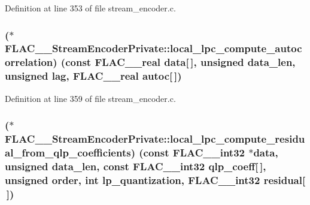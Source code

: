 Definition at line 353 of file stream\+\_\+encoder.\+c.

\subsubsection[{\texorpdfstring{local\+\_\+lpc\+\_\+compute\+\_\+autocorrelation}{local_lpc_compute_autocorrelation}}]{($\ast$ F\+L\+A\+C\+\_\+\+\_\+\+Stream\+Encoder\+Private\+::local\+\_\+lpc\+\_\+compute\+\_\+autocorrelation) ({\bf const} {\bf F\+L\+A\+C\+\_\+\+\_\+real} {\bf data}\mbox{[}$\,$\mbox{]}, unsigned data\+\_\+len, unsigned lag, {\bf F\+L\+A\+C\+\_\+\+\_\+real} autoc\mbox{[}$\,$\mbox{]})}\hypertarget{struct_f_l_a_c_____stream_encoder_private_a1cde2078fe00b6c3cc4834bfd7a08762}{}\label{struct_f_l_a_c_____stream_encoder_private_a1cde2078fe00b6c3cc4834bfd7a08762}


Definition at line 359 of file stream\+\_\+encoder.\+c.

\subsubsection[{\texorpdfstring{local\+\_\+lpc\+\_\+compute\+\_\+residual\+\_\+from\+\_\+qlp\+\_\+coefficients}{local_lpc_compute_residual_from_qlp_coefficients}}]{($\ast$ F\+L\+A\+C\+\_\+\+\_\+\+Stream\+Encoder\+Private\+::local\+\_\+lpc\+\_\+compute\+\_\+residual\+\_\+from\+\_\+qlp\+\_\+coefficients) ({\bf const} {\bf F\+L\+A\+C\+\_\+\+\_\+int32} $\ast${\bf data}, unsigned data\+\_\+len, {\bf const} {\bf F\+L\+A\+C\+\_\+\+\_\+int32} qlp\+\_\+coeff\mbox{[}$\,$\mbox{]}, unsigned {\bf order}, {\bf int} lp\+\_\+quantization, {\bf F\+L\+A\+C\+\_\+\+\_\+int32} residual\mbox{[}$\,$\mbox{]})}\hypertarget{struct_f_l_a_c_____stream_encoder_private_a72cb19c65bdd2fa889386cb54de8d8f9}{}\label{struct_f_l_a_c_____stream_encoder_private_a72cb19c65bdd2fa889386cb54de8d8f9}


